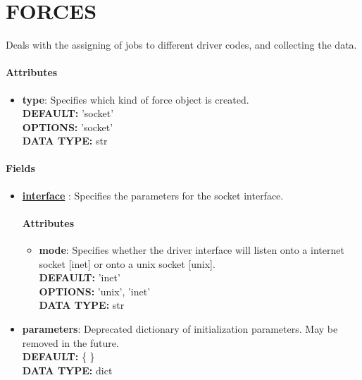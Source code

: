 \section{FORCES}
\label{FORCES}
Deals with the assigning of jobs to different driver codes, and collecting the data.
\paragraph{Attributes}
 \begin{itemize}
\item {\bf type}:
 Specifies which kind of force object is created.
{\\ \bf DEFAULT: }'socket'
{\\ \bf OPTIONS: }'socket'
{\\ \bf DATA TYPE: }str
\end{itemize}
 
\paragraph{Fields}
 \begin{itemize}
\item {\bf \hyperref[INTERFACE]{interface} }:
 Specifies the parameters for the socket interface.
\paragraph{Attributes}
 \begin{itemize}
\item {\bf mode}:
 Specifies whether the driver interface will listen onto a internet socket [inet] or onto a unix socket [unix].
{\\ \bf DEFAULT: }'inet'
{\\ \bf OPTIONS: }'unix', 'inet'
{\\ \bf DATA TYPE: }str
\end{itemize}
 
\item {\bf parameters}:
 Deprecated dictionary of initialization parameters. May be removed in the future.
{\\ \bf DEFAULT: }\{ \}
{\\ \bf DATA TYPE: }dict
\end{itemize}
 

